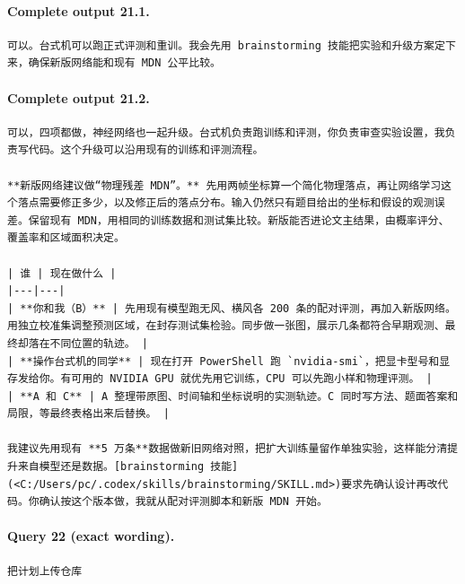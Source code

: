 \documentclass[UTF8,10pt]{ctexart}
\begin{document}
\paragraph{Complete output 21.1.}
\begin{Verbatim}[breaklines=true,breakanywhere=true,fontsize=\scriptsize,frame=single,framesep=2pt]
可以。台式机可以跑正式评测和重训。我会先用 brainstorming 技能把实验和升级方案定下来，确保新版网络能和现有 MDN 公平比较。
\end{Verbatim}

\paragraph{Complete output 21.2.}
\begin{Verbatim}[breaklines=true,breakanywhere=true,fontsize=\scriptsize,frame=single,framesep=2pt]
可以，四项都做，神经网络也一起升级。台式机负责跑训练和评测，你负责审查实验设置，我负责写代码。这个升级可以沿用现有的训练和评测流程。

**新版网络建议做“物理残差 MDN”。** 先用两帧坐标算一个简化物理落点，再让网络学习这个落点需要修正多少，以及修正后的落点分布。输入仍然只有题目给出的坐标和假设的观测误差。保留现有 MDN，用相同的训练数据和测试集比较。新版能否进论文主结果，由概率评分、覆盖率和区域面积决定。

| 谁 | 现在做什么 |
|---|---|
| **你和我（B）** | 先用现有模型跑无风、横风各 200 条的配对评测，再加入新版网络。用独立校准集调整预测区域，在封存测试集检验。同步做一张图，展示几条都符合早期观测、最终却落在不同位置的轨迹。 |
| **操作台式机的同学** | 现在打开 PowerShell 跑 `nvidia-smi`，把显卡型号和显存发给你。有可用的 NVIDIA GPU 就优先用它训练，CPU 可以先跑小样和物理评测。 |
| **A 和 C** | A 整理带原图、时间轴和坐标说明的实测轨迹。C 同时写方法、题面答案和局限，等最终表格出来后替换。 |

我建议先用现有 **5 万条**数据做新旧网络对照，把扩大训练量留作单独实验，这样能分清提升来自模型还是数据。[brainstorming 技能](<C:/Users/pc/.codex/skills/brainstorming/SKILL.md>)要求先确认设计再改代码。你确认按这个版本做，我就从配对评测脚本和新版 MDN 开始。
\end{Verbatim}

\paragraph{Query 22 (exact wording).}
\begin{Verbatim}[breaklines=true,breakanywhere=true,fontsize=\scriptsize,frame=single,framesep=2pt]
把计划上传仓库
\end{Verbatim}
\end{document}
